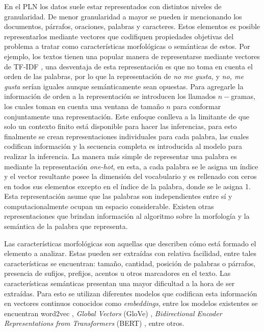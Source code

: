 \documentclass[a4paper,11pt,twocolumn,twoside]{article}
\begin{document}
En el PLN los datos suele estar representados con distintos niveles de granularidad.
De menor granularidad a mayor se pueden ir mencionando los documentos, párrafos, oraciones, palabras y
caracteres. Estos elementos es posible representarlos mediante vectores que codifiquen propiedades
objetivas del problema a tratar como características morfológicas o semánticas de estos. Por ejemplo, 
los textos tienen una popular manera de representarse mediante vectores de TF-IDF \cite{manning2008introduction},
una desventaja de esta representación es que no toma en cuenta el orden de las palabras, por lo que 
la representación de \textit{no me gusta,} y \textit{no, me gusta} serían iguales aunque semánticamente 
sean opuestas. Para agregarle la información de orden a la representación se introducen los llamados 
$n-$gramas, los cuales toman en cuenta una ventana de tamaño $n$ para conformar conjuntamente una representación.
Este enfoque conlleva a la limitante de que solo un contexto finito está disponible para hacer las inferencias,
para esto finalmente se crean representaciones individuales para cada palabra, las cuales codifican 
información y la secuencia completa es introducida al modelo para realizar la inferencia.
La manera más simple de representar una palabra es mediante la representación \textit{one-hot}, 
en esta, a cada palabra se le asigna un índice y el vector resultante posee la dimensión del 
vocabulario y es rellenado con ceros en todos sus elementos excepto en el índice de la palabra, donde se le asigna 1.
Esta representación asume que las palabras son independientes entre sí y 
computacionalmente ocupan un espacio considerable. Existen otras representaciones 
que brindan información al algoritmo sobre la morfología y la semántica de la palabra que representa.

Las características morfológicas son aquellas que describen cómo está formado el elemento a analizar.
Estas pueden ser extraídas con relativa facilidad, entre tales características se encuentran: tamaño, 
cantidad, posición de palabras o párrafos, presencia de sufijos, prefijos, acentos u otros marcadores
en el texto. Las características semánticas presentan una mayor dificultad a la hora de ser extraídas.
Para esto se utilizan diferentes modelos que codifican esta información en vectores continuos conocidos como 
\textit{embeddings}, entre los modelos existentes se encuentran
word2vec \cite{mikolov2013efficient}, 
\textit{Global Vectors} (GloVe) \cite{pennington2014glove}, 
\textit{Bidirectional Encoder Representations from Transformers} (BERT) \cite{devlin2018bert},
entre otros.
\end{document}
